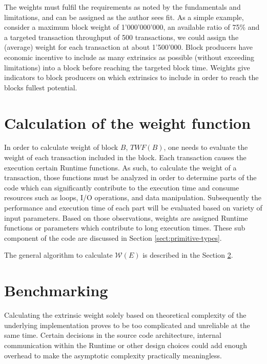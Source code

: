 \documentclass[11pt,a4paper]{article}
\newcommand{\TWF}{\ensuremath{\mathcal{W}}}
\begin{document}
The weights must fulfil the requirements as noted by the fundamentals and
limitations, and can be assigned as the author sees fit. As a simple example,
consider a maximum block weight of 1'000'000'000, an available ratio of 75\% and
a targeted transaction throughput of 500 transactions, we could assign the
(average) weight for each transaction at about 1'500'000. Block producers have
economic incentive to include as many extrinsics as possible (without exceeding
limitations) into a block before reaching the targeted block time. Weights give
indicators to block producers on which extrinsics to include in order to reach
the blocks fullest potential.

\section{Calculation of the weight function}
\label{sec:runtime-primitives}
In order to calculate weight of block $B$, $TWF(B)$, one needs to evaluate the
weight of each transaction included in the block. Each transaction causes the
execution certain Runtime functions. As such, to calculate the weight of a
transaction, those functions must be analyzed in order to determine parts of the
code which can significantly contribute to the execution time and consume
resources such as  loops, I/O operations, and data manipulation. Subsequently
the performance and execution time of each part will be evaluated based on
variety of input parameters. Based on those observations, weights are assigned
Runtime functions or parameters which contribute to long execution times.
These sub component of the code are discussed in Section
\ref{sect:primitive-types}.
\newline

The general algorithm to calculate $\TWF(E)$ is described in the Section
\ref{sect:benchmarking}.

\section{Benchmarking}\label{sect:benchmarking}
Calculating the extrinsic weight solely based on theoretical complexity of the
underlying implementation proves to be too complicated and unreliable at the
same time. Certain decisions in the source code architecture, internal
communication within the Runtime or other design choices could add enough
overhead to make the asymptotic complexity practically meaningless.
\newline
\end{document}
